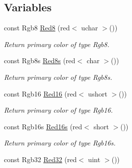 \subsection*{Variables}
\begin{DoxyCompactItemize}
\item 
\hypertarget{group___primary_colors_ga32848640a436555758f75cb92b30e8dd}{const Rgb8 \hyperlink{group___primary_colors_ga32848640a436555758f75cb92b30e8dd}{Red8} (red$<$ uchar $>$())}\label{group___primary_colors_ga32848640a436555758f75cb92b30e8dd}

\begin{DoxyCompactList}\small\item\em Return primary color of type Rgb8. \end{DoxyCompactList}\item 
\hypertarget{group___primary_colors_gae0daacdd8093bcea7ab7a93d09330d0f}{const Rgb8s \hyperlink{group___primary_colors_gae0daacdd8093bcea7ab7a93d09330d0f}{Red8s} (red$<$ char $>$())}\label{group___primary_colors_gae0daacdd8093bcea7ab7a93d09330d0f}

\begin{DoxyCompactList}\small\item\em Return primary color of type Rgb8s. \end{DoxyCompactList}\item 
\hypertarget{group___primary_colors_ga01b6fad2cf850d2df1a297bce56a4946}{const Rgb16 \hyperlink{group___primary_colors_ga01b6fad2cf850d2df1a297bce56a4946}{Red16} (red$<$ ushort $>$())}\label{group___primary_colors_ga01b6fad2cf850d2df1a297bce56a4946}

\begin{DoxyCompactList}\small\item\em Return primary color of type Rgb16. \end{DoxyCompactList}\item 
\hypertarget{group___primary_colors_gaa065a837acc59ab6d296af7439c4355d}{const Rgb16s \hyperlink{group___primary_colors_gaa065a837acc59ab6d296af7439c4355d}{Red16s} (red$<$ short $>$())}\label{group___primary_colors_gaa065a837acc59ab6d296af7439c4355d}

\begin{DoxyCompactList}\small\item\em Return primary color of type Rgb16s. \end{DoxyCompactList}\item 
\hypertarget{group___primary_colors_ga453ecaff530631986b586872f1a683c2}{const Rgb32 \hyperlink{group___primary_colors_ga453ecaff530631986b586872f1a683c2}{Red32} (red$<$ uint $>$())}\label{group___primary_colors_ga453ecaff530631986b586872f1a683c2}


\end{DoxyCompactItemize}
